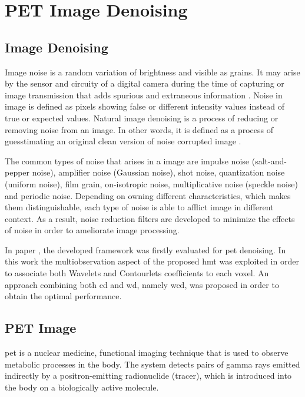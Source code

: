 \section{PET Image Denoising}

\subsection{Image Denoising}
Image noise is a random variation of brightness and visible as grains. It may arise
by the sensor and circuity of a digital camera during the time of capturing or image
transmission that adds spurious and extraneous information \cite{verma2013comparative}. Noise in image
is defined as pixels showing false or different intensity values instead of true or
expected values. Natural image denoising is a process of reducing or removing
noise from an image. In other words, it is defined as a process of guesstimating an
original clean version of noise corrupted image \cite{levin2011natural}.

The common types of noise that arises in a image are impulse noise (salt-and-pepper
noise), amplifier noise (Gaussian noise), shot noise, quantization noise (uniform
noise), film grain, on-isotropic noise, multiplicative noise (speckle noise) and periodic
noise. Depending on owning different characteristics, which makes them
distinguishable, each type of noise is able to afflict image in different context. As
a result, noise reduction filters are developed to minimize the effects of noise in
order to ameliorate image processing.

In paper \cite{hanzouli2013pet}, the developed framework was firstly evaluated for \gls{pet} denoising. In this work the multiobservation
aspect of the proposed \gls{hmt} was exploited in
order to associate both Wavelets and Contourlets coefficients
to each voxel. An approach combining both \gls{cd} and \gls{wd}, namely \gls{wcd}, was proposed in order to obtain the optimal performance.


\subsection{PET Image}
\gls{pet} is a nuclear medicine, functional imaging technique that is used to observe metabolic processes in the body. The system detects pairs of gamma rays emitted indirectly by a positron-emitting radionuclide (tracer), which is introduced into the body on a biologically active molecule. 

